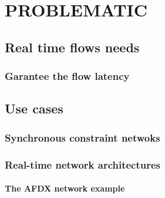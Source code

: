 

\chapter{PROBLEMATIC}
\doMinitoc

\section{Real time flows needs}

\subsection{Garantee the flow latency}

\section{Use cases}

\subsection{Synchronous constraint netwoks}

\subsection{Real-time network architectures}

\subsubsection{The AFDX network example}

